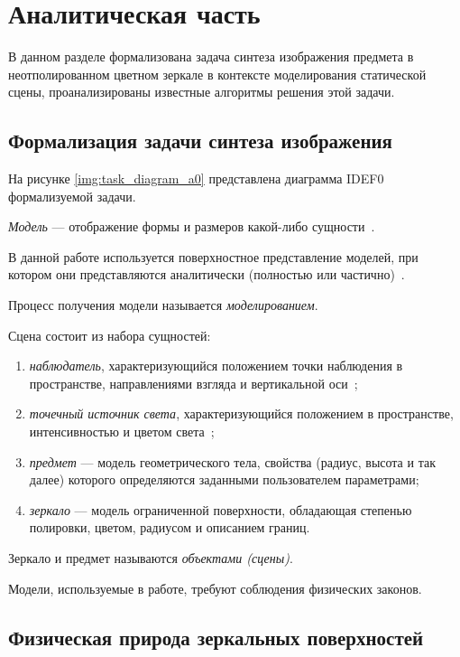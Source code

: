 \chapter{Аналитическая часть}

В данном разделе формализована задача синтеза изображения предмета в неотполированном цветном зеркале в контексте моделирования статической сцены, проанализированы известные алгоритмы решения этой задачи.

\section{Формализация задачи синтеза изображения}

На рисунке \ref{img:task_diagram_a0} представлена диаграмма IDEF0 формализуемой задачи.


\textit{Модель} --- отображение формы и размеров какой-либо сущности~\cite{куров}.

В данной работе используется поверхностное представление моделей, при котором они представляются аналитически (полностью или частично)~\cite{куров}.

Процесс получения модели называется \textit{моделированием}.

Сцена состоит из набора сущностей:
\begin{enumerate}
	\item \textit{наблюдатель}, характеризующийся положением точки наблюдения в пространстве, направлениями взгляда и вертикальной оси~\cite{куров};
	\item \textit{точечный источник света}, характеризующийся положением в пространстве, интенсивностью и цветом света~\cite{куров};
	\item \textit{предмет} --- модель геометрического тела, свойства (радиус, высота и так далее) которого определяются заданными пользователем параметрами;
	\item \textit{зеркало} --- модель ограниченной поверхности, обладающая степенью полировки, цветом, радиусом и описанием границ.
\end{enumerate}

Зеркало и предмет называются \textit{объектами (сцены)}.

Модели, используемые в работе, требуют соблюдения физических законов.

\section{Физическая природа зеркальных поверхностей}

